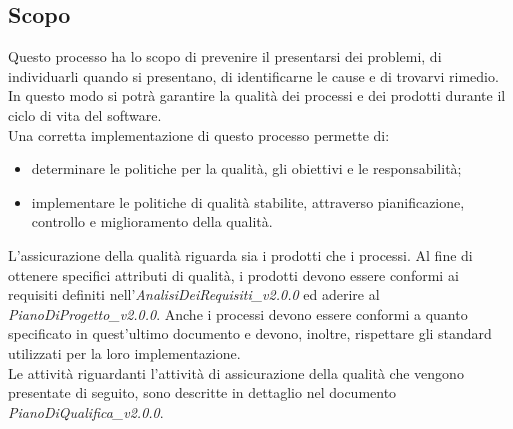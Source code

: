 \documentclass[11pt,a4paper]{article}
\begin{document}
{\subsection{Scopo}
Questo processo ha lo scopo di prevenire il presentarsi dei problemi, di individuarli quando si presentano, di identificarne le cause e di trovarvi rimedio. In questo modo si potrà garantire la qualità dei processi e dei prodotti durante il ciclo di vita del software.
\\
Una corretta implementazione di questo processo permette di:
\begin{itemize}
	\item determinare le politiche per la qualità, gli obiettivi e le responsabilità;
	\item implementare le politiche di qualità stabilite, attraverso pianificazione, controllo e miglioramento della qualità. 
\end{itemize}

L'assicurazione della qualità riguarda sia i prodotti che i processi. Al fine di ottenere specifici attributi di qualità, i prodotti devono essere conformi ai requisiti definiti nell'\textit{AnalisiDeiRequisiti\_v2.0.0} ed aderire al \textit{PianoDiProgetto\_v2.0.0}. Anche i processi devono essere conformi a quanto specificato in quest'ultimo documento e devono, inoltre, rispettare gli standard utilizzati per la loro implementazione. \\
Le attività riguardanti l'attività di assicurazione della qualità che vengono presentate di seguito, sono descritte in dettaglio nel documento \textit{PianoDiQualifica\_v2.0.0}.

}
\end{document}
